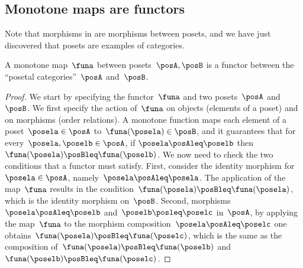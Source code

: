 \subsection{Monotone maps are functors}
Note that morphisms in \Pos are morphisms between posets, and we have just discovered that posets are examples of categories.
\begin{lemma}
  \label{lem:posetfunctor}
  A monotone map~$\funa$ between posets~$\posA,\posB$ is a functor between the ``posetal categories''~$\posA$ and~$\posB$.
\end{lemma}
\begin{proof}
  We start by specifying the functor~$\funa$ and two posets~$\posA$ and~$\posB$. We first specify the action of~$\funa$ on objects (elements of a poset) and on morphisms (order relations). A monotone function maps each element of a poset~$\posela\in \posA$ to~$\funa(\posela) \in \posB$, and it guarantees that for every~$\posela,\poselb\in \posA$, if $\posela\posAleq \poselb$ then~$\funa(\posela)\posBleq \funa(\poselb)$. We now need to check the two conditions that a functor must satisfy. First, consider the identity morphism for~$\posela\in \posA$, namely~$\posela \posAleq \posela$. The application of the map~$\funa$ results in the condition~$\funa(\posela)\posBleq \funa(\posela)$, which is the identity morphism on~$\posB$. Second, morphisms~$\posela\posAleq \poselb$ and~$\poselb\posleq \poselc$ in~$\posA$, by applying the map~$\funa$ to the morphism composition~$\posela\posAleq \poselc$ one obtains~$\funa(\posela)\posBleq \funa(\poselc)$, which is the same as the composition of~$\funa(\posela)\posBleq \funa(\poselb)$ and~$\funa(\poselb)\posBleq \funa(\poselc)$.
\end{proof}

\devel{} %
